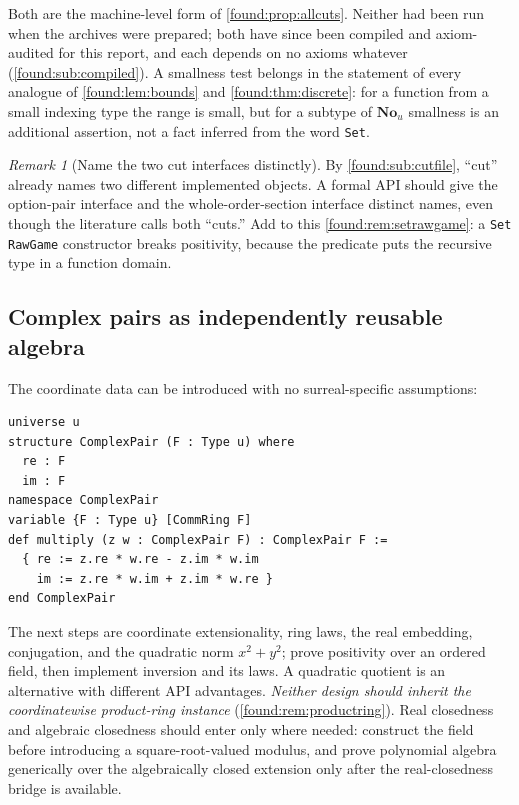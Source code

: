 \documentclass[11pt,letterpaper]{article}
\numberwithin{equation}{section}
\theoremstyle{definition}
\theoremstyle{remark}
\newtheorem{remark}[theorem]{Remark}
\newcommand{\No}{\mathbf{No}}
\begin{document}
Both are the machine-level form of \cref{found:prop:allcuts}. Neither had
been run when the archives were prepared; both have since been compiled and
axiom-audited for this report, and each depends on no axioms whatever
(\cref{found:sub:compiled}). A smallness test belongs in the statement
of every analogue of \cref{found:lem:bounds} and \cref{found:thm:discrete}: for
a function from a small indexing type the range is small, but for a subtype of
$\No_u$ smallness is an additional assertion, not a fact inferred from the word
\texttt{Set}.

\begin{remark}[Name the two cut interfaces distinctly]\label{found:rem:twocuts}
By \cref{found:sub:cutfile}, ``cut'' already names two different implemented
objects. A formal API should give the option-pair interface and the
whole-order-section interface distinct names, even though the literature calls
both ``cuts.'' Add to this \cref{found:rem:setrawgame}: a \texttt{Set RawGame}
constructor breaks positivity, because the predicate puts the recursive type in
a function domain.
\end{remark}

\subsection{Complex pairs as independently reusable algebra}
\label{found:sub:complexpair}
The coordinate data can be introduced with no surreal-specific assumptions:
\begin{samepage}
\begin{lstlisting}
universe u
structure ComplexPair (F : Type u) where
  re : F
  im : F
namespace ComplexPair
variable {F : Type u} [CommRing F]
def multiply (z w : ComplexPair F) : ComplexPair F :=
  { re := z.re * w.re - z.im * w.im
    im := z.re * w.im + z.im * w.re }
end ComplexPair
\end{lstlisting}
\end{samepage}
The next steps are coordinate extensionality, ring laws, the real embedding,
conjugation, and the quadratic norm $x^2+y^2$; prove positivity over an ordered
field, then implement inversion and its laws. A quadratic quotient is an
alternative with different API advantages. \emph{Neither design should inherit
the coordinatewise product-ring instance} (\cref{found:rem:productring}). Real
closedness and algebraic closedness should enter only where needed: construct
the field before introducing a square-root-valued modulus, and prove polynomial
algebra generically over the algebraically closed extension only after the
real-closedness bridge is available.
\end{document}
